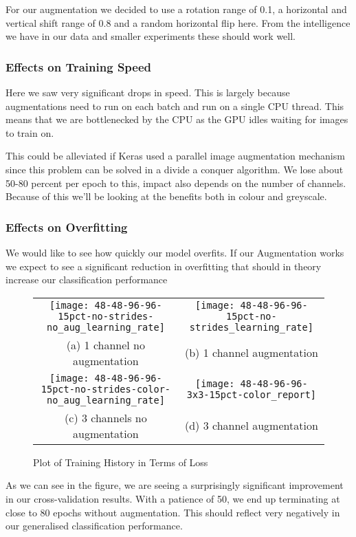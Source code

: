 For our augmentation we decided to use a rotation range of 0.1, a horizontal and vertical shift range of 0.8 and a random horizontal flip here. From the intelligence we have in our data and smaller experiments these should work well.
\subsubsection{Effects on Training Speed}
Here we saw very significant drops in speed. This is largely because augmentations need to run  on each batch and run on a single CPU thread. This means that we are bottlenecked by the CPU as the GPU idles waiting for images to train on.

This could be alleviated if Keras used a parallel image augmentation mechanism since this problem can be solved in a divide a conquer algorithm. We lose about 50-80 percent per epoch to this, impact also depends on the number of channels. Because of this we'll be looking at the benefits both in colour and greyscale.
\subsubsection{Effects on Overfitting}
We would like to see how quickly our model overfits. If our Augmentation works we expect to see a significant reduction in overfitting that should in theory increase our classification performance
\begin{figure}
	\begin{tabular}{cc}
		\texttt{[image: 48-48-96-96-15pct-no-strides-no\_aug\_learning\_rate]} &   \texttt{[image: 48-48-96-96-15pct-no-strides\_learning\_rate]} \\
		(a) 1 channel no augmentation & (b) 1 channel augmentation \\[6pt]
		\texttt{[image: 48-48-96-96-15pct-no-strides-color-no\_aug\_learning\_rate]} &   \texttt{[image: 48-48-96-96-3x3-15pct-color\_report]} \\
		(c) 3 channels no augmentation & (d) 3 channel augmentation \\[6pt]
	\end{tabular}
	\caption{Plot of Training History in Terms of Loss}
\end{figure}

As we can see in the figure, we are seeing a surprisingly significant improvement in our cross-validation results. With a patience of 50, we end up terminating at close to 80 epochs without augmentation. This should reflect very negatively in our generalised classification performance.

